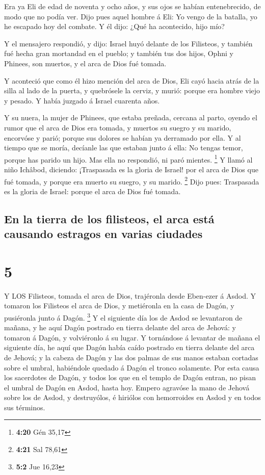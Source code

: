  Era ya Eli de edad de noventa y ocho años, y sus ojos se
habían entenebrecido, de modo que no podía ver.  Dijo pues
aquel hombre á Eli: Yo vengo de la batalla, yo he escapado hoy del
combate. Y él dijo: ¿Qué ha acontecido, hijo mío?

 Y el mensajero respondió, y dijo: Israel huyó delante de
los Filisteos, y también fué hecha gran mortandad en el pueblo; y
también tus dos hijos, Ophni y Phinees, son muertos, y el arca de Dios
fué tomada.

 Y aconteció que como él hizo mención del arca de Dios, Eli
cayó hacia atrás de la silla al lado de la puerta, y quebrósele la
cerviz, y murió: porque era hombre viejo y pesado. Y había juzgado á
Israel cuarenta años.

 Y su nuera, la mujer de Phinees, que estaba preñada,
cercana al parto, oyendo el rumor que el arca de Dios era tomada, y
muertos su suegro y su marido, encorvóse y parió; porque sus dolores se
habían ya derramado por ella.  Y al tiempo que se moría,
decíanle las que estaban junto á ella: No tengas temor, porque has
parido un hijo. Mas ella no respondió, ni paró mientes. \footnote{\textbf{4:20}
  Gén 35,17}  Y llamó al niño Ichâbod, diciendo:
¡Traspasada es la gloria de Israel! por el arca de Dios que fué tomada,
y porque era muerto su suegro, y su marido. \footnote{\textbf{4:21} Sal
  78,61}  Dijo pues: Traspasada es la gloria de Israel:
porque el arca de Dios fué tomada.

\hypertarget{en-la-tierra-de-los-filisteos-el-arca-estuxe1-causando-estragos-en-varias-ciudades}{%
\subsection{En la tierra de los filisteos, el arca está causando
estragos en varias
ciudades}\label{en-la-tierra-de-los-filisteos-el-arca-estuxe1-causando-estragos-en-varias-ciudades}}

\hypertarget{section-4}{%
\section{5}\label{section-4}}

 Y LOS Filisteos, tomada el arca de Dios, trajéronla desde
Eben-ezer á Asdod.  Y tomaron los Filisteos el arca de Dios,
y metiéronla en la casa de Dagón, y pusiéronla junto á Dagón.
\footnote{\textbf{5:2} Jue 16,23}  Y el siguiente día los de
Asdod se levantaron de mañana, y he aquí Dagón postrado en tierra
delante del arca de Jehová: y tomaron á Dagón, y volviéronlo á su lugar.
 Y tornándose á levantar de mañana el siguiente día, he aquí
que Dagón había caído postrado en tierra delante del arca de Jehová; y
la cabeza de Dagón y las dos palmas de sus manos estaban cortadas sobre
el umbral, habiéndole quedado á Dagón el tronco solamente. 
Por esta causa los sacerdotes de Dagón, y todos los que en el templo de
Dagón entran, no pisan el umbral de Dagón en Asdod, hasta hoy.
 Empero agravóse la mano de Jehová sobre los de Asdod, y
destruyólos, é hiriólos con hemorroides en Asdod y en todos sus
términos.

